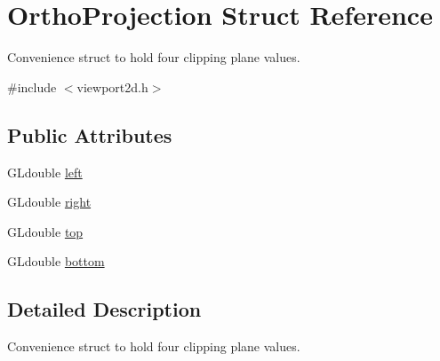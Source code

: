 \hypertarget{struct_ortho_projection}{\section{Ortho\-Projection Struct Reference}
\label{struct_ortho_projection}
}


Convenience struct to hold four clipping plane values.  




{\ttfamily \#include $<$viewport2d.\-h$>$}

\subsection*{Public Attributes}
\begin{DoxyCompactItemize}
\item 
G\-Ldouble \hyperlink{struct_ortho_projection_a4cacc486e79687686061e32cf8eaeb2a}{left}
\item 
G\-Ldouble \hyperlink{struct_ortho_projection_a140ce0f7bca9b77c1c511e711836c4cc}{right}
\item 
G\-Ldouble \hyperlink{struct_ortho_projection_a6cb9f21197e582876b5d1dba5d83333a}{top}
\item 
G\-Ldouble \hyperlink{struct_ortho_projection_ae2a5eb9c806d61f26cbce67639880915}{bottom}
\end{DoxyCompactItemize}


\subsection{Detailed Description}
Convenience struct to hold four clipping plane values. 

